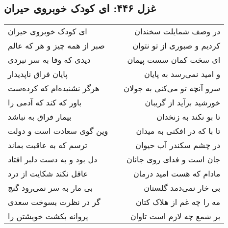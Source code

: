 \begin{center}
\section*{غزل ۴۴۶: ای کودک خوبروی حیران}
\label{sec:446}
\begin{longtable}{l p{0.5cm} r}
ای کودک خوبروی حیران
&&
در وصف شمایلت سخندان
\\
صبر از همه چیز و هر که عالم
&&
کردیم و صبوری از تو نتوان
\\
دیدی که وفا به سر نبردی
&&
ای سخت کمان سست پیمان
\\
پایان فراق ناپدیدار
&&
و امید نمی‌رسد به پایان
\\
هرگز نشنیده‌ام که کرده‌ست
&&
سرو آنچه تو می‌کنی به جولان
\\
باور که کند که آدمی را
&&
خورشید برآید از گریبان
\\
بیمار فراق به نباشد
&&
تا بو نکند به زنخدان
\\
وین گوی سعادت است و دولت
&&
تا با که در افکنی به میدان
\\
ترسم که به عاقبت بماند
&&
در چشم سکندر آب حیوان
\\
دل بود و به دست دلبر افتاد
&&
جان است و فدای روی جانان
\\
عاقل نکند شکایت از درد
&&
مادام که هست امید درمان
\\
بی مار به سر نمی‌رود گنج
&&
بی خار نمی‌دمد گلستان
\\
گر در نظرت بسوخت سعدی
&&
مه را چه غم از هلاک کتان
\\
پروانه بکشت خویشتن را
&&
بر شمع چه لازم است تاوان
\\
\end{longtable}
\end{center}
